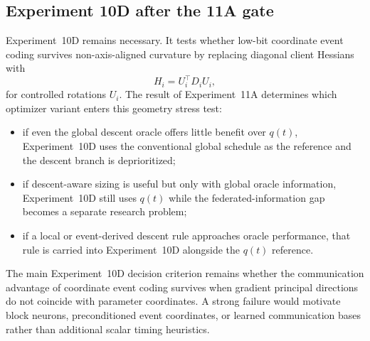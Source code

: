 \subsection{Experiment 10D after the 11A gate}

Experiment~10D remains necessary. It tests whether low-bit coordinate event coding survives non-axis-aligned curvature by replacing diagonal client Hessians with
\begin{equation}
  H_i=U_i^\top D_iU_i,
\end{equation}
for controlled rotations $U_i$. The result of Experiment~11A determines which optimizer variant enters this geometry stress test:
\begin{itemize}
  \item if even the global descent oracle offers little benefit over $q(t)$, Experiment~10D uses the conventional global schedule as the reference and the descent branch is deprioritized;
  \item if descent-aware sizing is useful but only with global oracle information, Experiment~10D still uses $q(t)$ while the federated-information gap becomes a separate research problem;
  \item if a local or event-derived descent rule approaches oracle performance, that rule is carried into Experiment~10D alongside the $q(t)$ reference.
\end{itemize}

The main Experiment~10D decision criterion remains whether the communication advantage of coordinate event coding survives when gradient principal directions do not coincide with parameter coordinates. A strong failure would motivate block neurons, preconditioned event coordinates, or learned communication bases rather than additional scalar timing heuristics.

